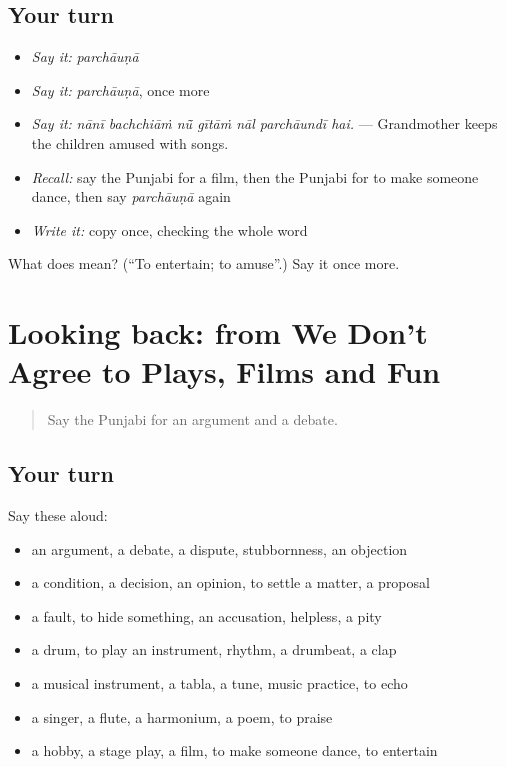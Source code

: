 \subsection*{Your turn}
\begin{itemize}
\raggedright
  \item \emph{Say it:} \emph{parchāuṇā}
  \item \emph{Say it:} \emph{parchāuṇā}, once more
  \item \emph{Say it:} \emph{nānī bachchiāṁ nū̃ gītāṁ nāl parchāundī hai.} — Grandmother keeps the children amused with songs.
  \item \emph{Recall:} say the Punjabi for a film, then the Punjabi for to make someone dance, then say \emph{parchāuṇā} again
  \item \emph{Write it:} copy \textbf{} once, checking the whole word
\end{itemize}

\begin{tcolorbox}[breakable,colback=teal!4,colframe=teal!35!black,title={Before you move on}]
What does  mean? (\textquotedblleft{}To entertain; to amuse\textquotedblright{}.) Say it once more.
\end{tcolorbox}
\section[(dialogue)]{Looking back: from We Don't Agree to Plays, Films and Fun}

\label{lesson:PA-R350-review-344-350}



\begin{quote}
Say the Punjabi for an argument and a debate.
\end{quote}

\subsection*{Your turn}
Say these aloud:

\begin{itemize}
\raggedright
  \item an argument, a debate, a dispute, stubbornness, an objection
  \item a condition, a decision, an opinion, to settle a matter, a proposal
  \item a fault, to hide something, an accusation, helpless, a pity
  \item a drum, to play an instrument, rhythm, a drumbeat, a clap
  \item a musical instrument, a tabla, a tune, music practice, to echo
  \item a singer, a flute, a harmonium, a poem, to praise
  \item a hobby, a stage play, a film, to make someone dance, to entertain
\end{itemize}

